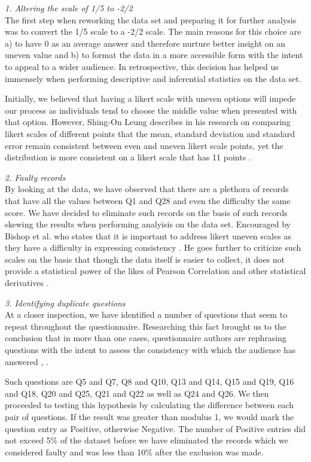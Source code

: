 \documentclass[twocolumn]{article}
\begin{document}
\emph{1. Altering the scale of 1/5 to -2/2} \\
The first step when reworking the data set and preparing it for further analysis was to convert the 1/5 scale to a -2/2 scale. The main reasons for this choice are a) to have 0 as an average answer and therefore nurture better insight on an uneven value and b) to format the data in a more accessible form with the intent to appeal to a wider audience. In retrospective, this decision has helped us immensely when performing descriptive and inferential statistics on the data set.

Initially, we believed that having a likert scale with uneven options will impede our process as individuals tend to choose the middle value when presented with that option. However, Shing-On Leung describes in his research on comparing likert scales of different points that the mean, standard deviation and standard error remain consistent between even and uneven likert scale points, yet the distribution is more consistent on a likert scale that has 11 points \cite{Leung2011}.

\emph{2. Faulty records} \\
By looking at the data, we have observed that there are a plethora of records that have all the values between Q1 and Q28 and even the difficulty the same score. We have decided to eliminate such records on the basis of such records skewing the results when performing analyisis on the data set. Encouraged by Bishop et al. who states that it is important to address likert uneven scales as they have a difficulty in expressing consistency \cite{Bishop}. He goes further to criticize such scales on the basis that though the data itself is easier to collect, it does not provide a statistical power of the likes of Pearson Correlation and other statistical derivatives \cite{Bishop}.

\emph{3. Identifying duplicate questions} \\
At a closer inspection, we have identified a number of questions that seem to repeat throughout the questionnaire. Researching this fact brought us to the conclusion that in more than one cases, questionnaire authors are rephrasing questions with the intent to assess the consistency with which the audience has answered \cite{Rattray2007}, \cite{Krosnick2010}. 

Such questions are Q5 and Q7, Q8 and Q10, Q13 and Q14, Q15 and Q19, Q16 and Q18, Q20 and Q25, Q21 and Q22 as well as Q24 and Q26. We then proceeded to testing this hypothesis by calculating the difference between each pair of questions. If the result was greater than modulus 1, we would mark the question entry as Positive, otherwise Negative. 
The number of Positive entries did not exceed 5\% of the dataset before we have eliminated the records which we considered faulty and was less than 10\% after the exclusion was made.
\end{document}
